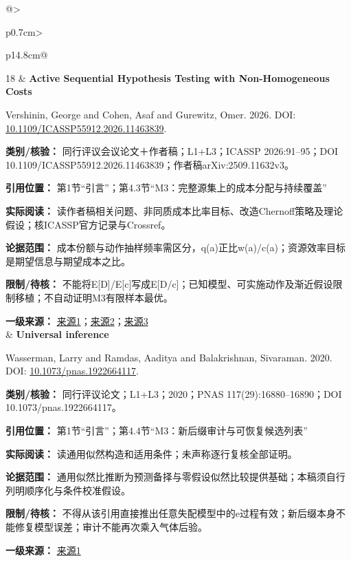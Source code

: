 \begin{longtable}{@{}>{\raggedright\arraybackslash}p{0.7cm}>{\raggedright\arraybackslash}p{14.8cm}@{}}
18 & \textbf{Active Sequential Hypothesis Testing with Non-Homogeneous Costs}\par Vershinin, George and Cohen, Asaf and Gurewitz, Omer. 2026. DOI: \url{10.1109/ICASSP55912.2026.11463839}. \par\textbf{类别/核验：} 同行评议会议论文＋作者稿；L1+L3；ICASSP 2026:91–95；DOI 10.1109/ICASSP55912.2026.11463839；作者稿arXiv:2509.11632v3。\par\textbf{引用位置：} 第1节“引言”；第4.3节“M3：完整源集上的成本分配与持续覆盖”\par\textbf{实际阅读：} 读作者稿相关问题、非同质成本比率目标、改造Chernoff策略及理论假设；核ICASSP官方记录与Crossref。\par\textbf{论据范围：} 成本份额与动作抽样频率需区分，q(a)正比w(a)/c(a)；资源效率目标是期望信息与期望成本之比。\par\textbf{限制/待核：} 不能将E[D]/E[c]写成E[D/c]；已知模型、可实施动作及渐近假设限制移植；不自动证明M3有限样本最优。\par\textbf{一级来源：} \href{https://arxiv.org/html/2509.11632v3}{来源1}；\href{https://www.cmsworkshops.com/ICASSP2026/view_paper.php?PaperNum=7206&bare=1}{来源2}；\href{https://doi.org/10.1109/ICASSP55912.2026.11463839}{来源3} \\ & \textbf{Universal inference}\par Wasserman, Larry and Ramdas, Aaditya and Balakrishnan, Sivaraman. 2020. DOI: \url{10.1073/pnas.1922664117}. \par\textbf{类别/核验：} 同行评议论文；L1+L3；2020；PNAS 117(29):16880–16890；DOI 10.1073/pnas.1922664117。\par\textbf{引用位置：} 第1节“引言”；第4.4节“M3：新后缀审计与可恢复候选列表”\par\textbf{实际阅读：} 读通用似然构造和适用条件；未声称逐行复核全部证明。\par\textbf{论据范围：} 通用似然比推断为预测备择与零假设似然比较提供基础；本稿须自行列明顺序化与条件校准假设。\par\textbf{限制/待核：} 不得从该引用直接推出任意失配模型中的e过程有效；新后缀本身不能修复模型误差；审计不能再次乘入气体后验。\par\textbf{一级来源：} \href{https://www.pnas.org/doi/10.1073/pnas.1922664117}{来源1} \\\addlinespace[6pt]

\end{longtable}
